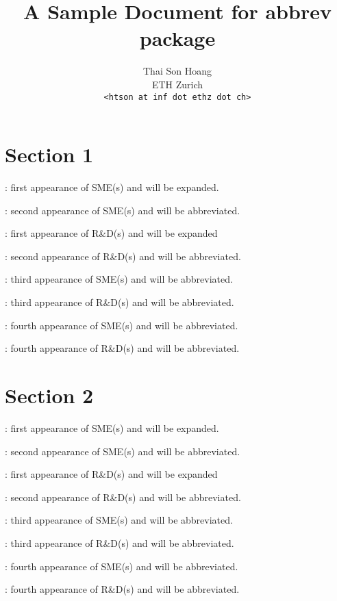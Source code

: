 \title{A Sample Document for \textsf{abbrev} package}
\author{Thai Son Hoang\\ETH Zurich\\\texttt{<htson at inf dot ethz dot
    ch>}}


\maketitle


\section{Section 1}
\label{sec:section-1}

\SMEs: first appearance of SME(s) and will be expanded.

\SME: second appearance of SME(s) and will be abbreviated. 

\randd: first appearance of R\&D(s) and will be expanded

\randds: second appearance of R\&D(s) and will be abbreviated.

\SMEs: third appearance of SME(s) and will be abbreviated.

\randds: third appearance of R\&D(s) and will be abbreviated.

\SMEs: fourth appearance of SME(s) and will be abbreviated.

\randd: fourth appearance of R\&D(s) and will be abbreviated.

\section{Section 2}
\label{sec:section-2}

\resetabbrev

\SMEs: first appearance of SME(s) and will be expanded.

\SME: second appearance of SME(s) and will be abbreviated. 

\randd: first appearance of R\&D(s) and will be expanded

\randds: second appearance of R\&D(s) and will be abbreviated.

\SMEs: third appearance of SME(s) and will be abbreviated.

\randds: third appearance of R\&D(s) and will be abbreviated.

\SMEs: fourth appearance of SME(s) and will be abbreviated.

\randd: fourth appearance of R\&D(s) and will be abbreviated.

\printnomenclature


